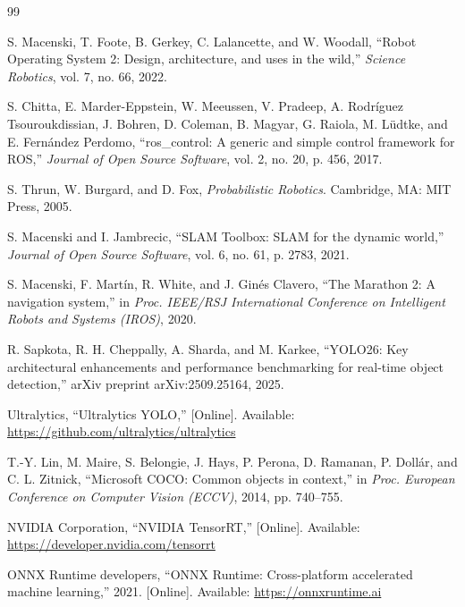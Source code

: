 \documentclass[a4paper,12pt]{report}
\newcounter{savedfront}
\newcommand{\resumefrontpage}{%
  \clearpage
  \pagenumbering{thaialph}\setcounter{page}{\value{savedfront}}}
\begin{document}
\resumefrontpage

\begin{thebibliography}{99}

S. Macenski, T. Foote, B. Gerkey, C. Lalancette, and W. Woodall,
``Robot Operating System 2: Design, architecture, and uses in the wild,''
\textit{Science Robotics}, vol. 7, no. 66, 2022.

S. Chitta, E. Marder-Eppstein, W. Meeussen, V. Pradeep, A. Rodr\'iguez Tsouroukdissian,
J. Bohren, D. Coleman, B. Magyar, G. Raiola, M. L\"udtke, and E. Fern\'andez Perdomo,
``ros\_control: A generic and simple control framework for ROS,''
\textit{Journal of Open Source Software}, vol. 2, no. 20, p. 456, 2017.

S. Thrun, W. Burgard, and D. Fox,
\textit{Probabilistic Robotics}. Cambridge, MA: MIT Press, 2005.

S. Macenski and I. Jambrecic,
``SLAM Toolbox: SLAM for the dynamic world,''
\textit{Journal of Open Source Software}, vol. 6, no. 61, p. 2783, 2021.

S. Macenski, F. Mart\'in, R. White, and J. Gin\'es Clavero,
``The Marathon 2: A navigation system,''
in \textit{Proc. IEEE/RSJ International Conference on Intelligent Robots
and Systems (IROS)}, 2020.

R. Sapkota, R. H. Cheppally, A. Sharda, and M. Karkee,
``YOLO26: Key architectural enhancements and performance benchmarking
for real-time object detection,''
arXiv preprint arXiv:2509.25164, 2025.

Ultralytics,
``Ultralytics YOLO,''
[Online]. Available: \url{https://github.com/ultralytics/ultralytics}

T.-Y. Lin, M. Maire, S. Belongie, J. Hays, P. Perona, D. Ramanan, P. Doll\'ar,
and C. L. Zitnick,
``Microsoft COCO: Common objects in context,''
in \textit{Proc. European Conference on Computer Vision (ECCV)}, 2014, pp. 740--755.

NVIDIA Corporation,
``NVIDIA TensorRT,''
[Online]. Available: \url{https://developer.nvidia.com/tensorrt}

ONNX Runtime developers,
``ONNX Runtime: Cross-platform accelerated machine learning,''
2021. [Online]. Available: \url{https://onnxruntime.ai}


\end{thebibliography}
\end{document}
